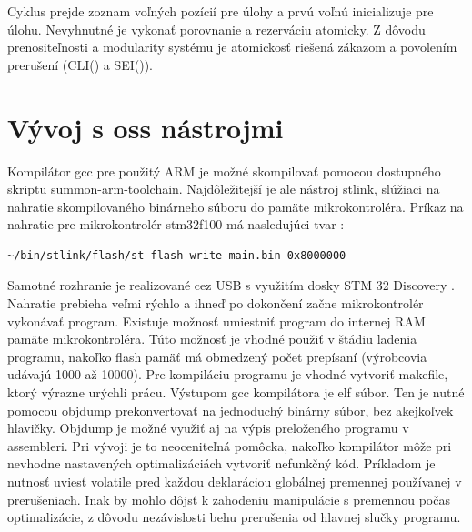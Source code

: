 \documentclass[twoside]{oss-conf}
\begin{document}
Cyklus prejde zoznam voľných pozícií pre úlohy a prvú voľnú inicializuje pre úlohu. Nevyhnutné je vykonať porovnanie a rezerváciu
atomicky. Z dôvodu prenositeľnosti a modularity systému je atomickosť riešená zákazom a povolením prerušení (CLI() a SEI()).

\section{Vývoj s oss nástrojmi}
Kompilátor gcc pre použitý ARM je možné skompilovať pomocou dostupného skriptu summon-arm-toolchain. Najdôležitejší je ale nástroj stlink, slúžiaci na nahratie skompilovaného binárneho súboru do pamäte mikrokontroléra. Príkaz na nahratie pre mikrokontrolér stm32f100 má nasledujúci tvar :
\begin{verbatim}
~/bin/stlink/flash/st-flash write main.bin 0x8000000
\end{verbatim}
Samotné rozhranie je realizované cez USB s využitím dosky STM 32 Discovery \cite{disckit}. Nahratie prebieha veľmi rýchlo
a ihneď po dokončení začne mikrokontrolér vykonávať program. Existuje možnosť umiestniť program do internej RAM pamäte mikrokontroléra. Túto možnosť je vhodné použiť v štádiu ladenia programu, nakoľko flash pamäť má obmedzený počet prepísaní (výrobcovia udávajú 1000 až 10000).
Pre kompiláciu programu je vhodné vytvoriť makefile, ktorý výrazne urýchli prácu. Výstupom gcc kompilátora je elf súbor. Ten je nutné pomocou objdump prekonvertovať na jednoduchý binárny súbor, bez akejkoľvek hlavičky. Objdump je možné využiť aj na výpis preloženého programu v assembleri. Pri vývoji je to neoceniteľná pomôcka, nakoľko kompilátor môže pri nevhodne nastavených optimalizáciách vytvoriť
nefunkčný kód. Príkladom je nutnosť uviesť volatile pred každou deklaráciou globálnej premennej používanej v prerušeniach. Inak by mohlo dôjsť k zahodeniu manipulácie s premennou počas optimalizácie, z dôvodu nezávislosti behu prerušenia od hlavnej slučky programu.
\end{document}
